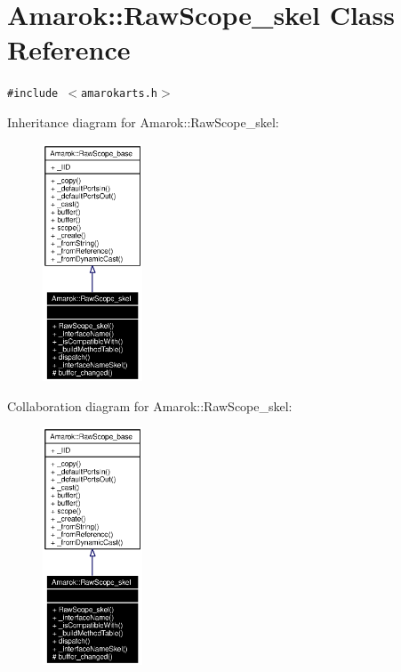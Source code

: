 \section{Amarok::Raw\-Scope\_\-skel Class Reference}
\label{classAmarok_1_1RawScope__skel}
{\tt \#include $<$amarokarts.h$>$}

Inheritance diagram for Amarok::Raw\-Scope\_\-skel:\begin{figure}[H]
\begin{center}
\leavevmode
\includegraphics[width=84pt]{classAmarok_1_1RawScope__skel__inherit__graph}
\end{center}
\end{figure}
Collaboration diagram for Amarok::Raw\-Scope\_\-skel:\begin{figure}[H]
\begin{center}
\leavevmode
\includegraphics[width=84pt]{classAmarok_1_1RawScope__skel__coll__graph}
\end{center}
\end{figure}

